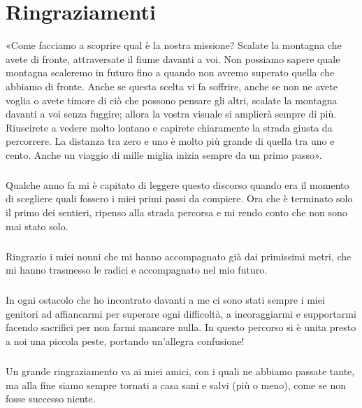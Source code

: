 \chapter{Ringraziamenti}

«Come facciamo a scoprire qual è la nostra missione?
Scalate la montagna che avete di fronte, attraversate il fiume davanti a voi.
Non possiamo sapere quale montagna scaleremo in futuro fino a quando non avremo superato quella che abbiamo di fronte.
Anche se questa	scelta vi fa soffrire, anche se non ne avete voglia o avete timore di ciò che possono pensare gli altri, scalate la montagna davanti a voi senza fuggire;
allora la vostra visuale si amplierà sempre di più.
Riuscirete a vedere molto lontano e capirete chiaramente la strada giusta da percorrere.
La distanza tra zero e uno è molto più grande di quella tra uno e cento.
Anche un viaggio di mille miglia inizia sempre da un primo passo».

\paragraph{}
Qualche anno fa mi è capitato di leggere questo discorso quando era il momento di scegliere quali fossero i miei primi passi da compiere. Ora che è terminato solo il primo dei sentieri, ripenso alla strada percorsa e mi rendo conto che non sono mai stato solo.

\paragraph{}
Ringrazio i miei nonni che mi hanno accompagnato già dai primissimi metri, che mi hanno trasmesso le radici e accompagnato nel mio futuro.

\paragraph{}
In ogni ostacolo che ho incontrato davanti a me ci sono stati sempre i miei genitori ad affiancarmi per superare ogni difficoltà, a incoraggiarmi e supportarmi facendo sacrifici per non farmi mancare nulla. In questo percorso si è unita presto a noi una piccola peste, portando un'allegra confusione!

\paragraph{}
Un grande ringraziamento va ai miei amici, con i quali ne abbiamo passate tante, ma alla fine siamo sempre tornati a casa sani e salvi (più o meno), come se non fosse successo niente.

